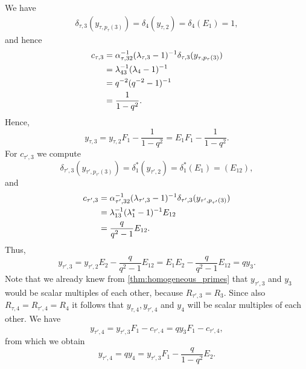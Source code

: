 \begin{example}
	We have
	\begin{align*}
		\delta_{\tau, 3}(y_{\tau, p_\tau(3)})
		= \delta_4(y_{\tau, 2})
		= \delta_4(E_1)
		= 1,
	\end{align*}
	and hence
	\begin{align*}
		c_{\tau, 3}
		 & = \alpha_{\tau, 32}^{-1} (\lambda_{\tau, 3} - 1)^{-1} \delta_{\tau, 3}(y_{\tau, p_\tau(3)}) \\
		 & = \lambda_{43}^{-1} (\lambda_{4} - 1)^{-1}                                                  \\
		 & = q^{-2} (q^{-2} - 1)^{-1}                                                                 \\
		 & = \frac{1}{1-q^2}.
	\end{align*}
	Hence,
	\begin{equation*}
		y_{\tau, 3} = y_{\tau, 2}F_1 - \frac{1}{1-q^2} = E_1 F_1 - \frac{1}{1-q^2}.
	\end{equation*}
	For $c_{\tau', 3}$ we compute
	\begin{equation*}
		\delta_{\tau', 3}(y_{\tau', p_{\tau'}(3)}) = \delta_1^*(y_{\tau', 2}) = \delta_1^*(E_1) = (E_{12}),
	\end{equation*}
	and
	\begin{align*}
		c_{\tau', 3}
		 & = \alpha_{\tau', 32}^{-1} (\lambda_{\tau', 3} - 1)^{-1} \delta_{\tau', 3}(y_{\tau', p_{\tau'}(3)}) \\
		 & = \lambda_{13}^{-1} (\lambda_{1}^* - 1)^{-1}  E_{12}                                               \\
		 & =  \frac{q}{q^2 - 1} E_{12}.
	\end{align*}
	Thus,
	\begin{equation*}
		y_{\tau', 3} = y_{\tau', 2}E_2 - \frac{q}{q^2 -1} E_{12} = E_1 E_2 - \frac{q}{q^2-1}E_{12} = q y_3.
	\end{equation*}
	Note that we already knew from \cref{thm:homogeneous_primes} that $y_{\tau', 3}$ and
	$y_3$ would be scalar multiples of each other, because $R_{\tau', 3} = R_3$. Since also
	$R_{\tau, 4} = R_{\tau', 4} = R_4$ it follows that $y_{\tau, 4}, y_{\tau', 4}$ and
	$y_4$ will be scalar multiples of each other. We have
	\begin{equation*}
		y_{\tau', 4} = y_{\tau',3} F_1 - c_{\tau',4} = q y_3 F_1 - c_{\tau',4},
	\end{equation*}
	from which we obtain
	\begin{equation*}
		y_{\tau', 4} = qy_4 = y_{\tau', 3} F_1 - \frac{q}{1-q^2}E_2.
	\end{equation*}

\end{example}
